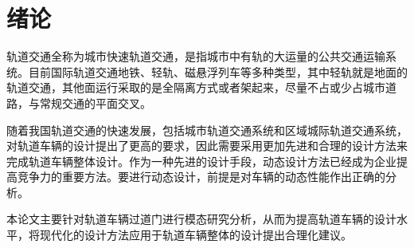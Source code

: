 \section{绪论}
轨道交通全称为城市快速轨道交通，是指城市中有轨的大运量的公共交通运输系统。目前国际轨道交通地铁、轻轨、磁悬浮列车等多种类型，其中轻轨就是地面的轨道交通，其他面运行采取的是全隔离方式或者架起来，尽量不占或少占城市道路，与常规交通的平面交叉。

随着我国轨道交通的快速发展，包括城市轨道交通系统和区域城际轨道交通系统，对轨道车辆的设计提出了更高的要求，因此需要采用更加先进和合理的设计方法来完成轨道车辆整体设计。作为一种先进的设计手段，动态设计方法已经成为企业提高竞争力的重要方法。要进行动态设计，前提是对车辆的动态性能作出正确的分析。

本论文主要针对轨道车辆过道门进行模态研究分析，从而为提高轨道车辆的设计水平，将现代化的设计方法应用于轨道车辆整体的设计提出合理化建议。

